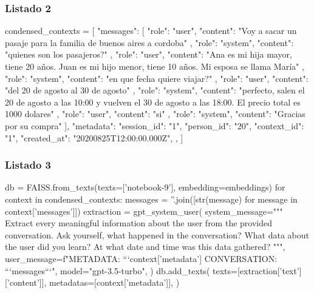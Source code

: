 \subsubsection{Listado 2}
\label{anexo:code-4-1-10-2}

\begin{APACode}
condensed_contexts = [
    {
        "messages": [
            {
                "role": "user",
                "content": "Voy a sacar un pasaje para la familia de buenos aires a cordoba"
            },
            {
                "role": "system",
                "content": "quienes son los pasajeros?"
            },
            {
                "role": "user",
                "content": "Ana es mi hija mayor, tiene 20 años. Juan es mi hijo menor, tiene 10 años. Mi esposa se llama María"
            },
            {
                "role": "system",
                "content": "en que fecha quiere viajar?"
            },
            {
                "role": "user",
                "content": "del 20 de agosto al 30 de agosto"
            },
            {
                "role": "system",
                "content": "perfecto, salen el 20 de agosto a las 10:00 y vuelven el 30 de agosto a las 18:00. El precio total es 1000 dolares"
            },
            {
                "role": "user",
                "content": "si"
            },
            {
                "role": "system",
                "content": "Gracias por su compra"
            }
        ],
        "metadata": {
            "session_id": "1",
            "person_id": "20",
            "context_id": "1",
            "created_at": "20200825T12:00:00.000Z",
        },
    }
]
\end{APACode}

\subsubsection{Listado 3}
\label{anexo:code-4-1-10-3}

\begin{APACode}
db = FAISS.from_texts(texts=['notebook-9'], embedding=embeddings)
for context in condensed_contexts:
    messages = ''.join([str(message) for message in context['messages']])
    extraction = gpt_system_user(
        system_message="""
        Extract every meaningful information about the user from the provided conversation. 
        Ask yourself, what happened in the conversation?
        What data about the user did you learn?
        At what date and time was this data gathered?
        """,
        user_message=f"METADATA: ```{context['metadata']} CONVERSATION: ```{messages}```",
        model="gpt-3.5-turbo",
    )
    db.add_texts(
        texts=[extraction['text']['content']],
        metadatas=[context['metadata']],
    )
\end{APACode}

